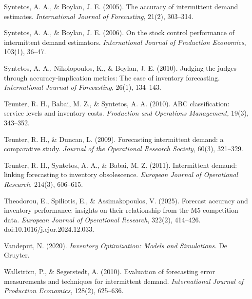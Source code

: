 \documentclass[11pt]{article}
\begin{document}
\begin{list}{}{%
  \setlength{\leftmargin}{1.5em}%
  \setlength{\itemindent}{-1.5em}%
  \setlength{\itemsep}{4pt}%
  \setlength{\parsep}{0pt}}
\item Syntetos, A. A., \& Boylan, J. E. (2005). The accuracy of intermittent
demand estimates. \emph{International Journal of Forecasting}, 21(2), 303--314.

\item Syntetos, A. A., \& Boylan, J. E. (2006). On the stock control
performance of intermittent demand estimators. \emph{International Journal of
Production Economics}, 103(1), 36--47.

\item Syntetos, A. A., Nikolopoulos, K., \& Boylan, J. E. (2010). Judging the
judges through accuracy-implication metrics: The case of inventory
forecasting. \emph{International Journal of Forecasting}, 26(1), 134--143.

\item Teunter, R. H., Babai, M. Z., \& Syntetos, A. A. (2010). ABC
classification: service levels and inventory costs. \emph{Production and
Operations Management}, 19(3), 343--352.

\item Teunter, R. H., \& Duncan, L. (2009). Forecasting intermittent demand:
a comparative study. \emph{Journal of the Operational Research Society},
60(3), 321--329.

\item Teunter, R. H., Syntetos, A. A., \& Babai, M. Z. (2011). Intermittent
demand: linking forecasting to inventory obsolescence. \emph{European Journal
of Operational Research}, 214(3), 606--615.

\item Theodorou, E., Spiliotis, E., \& Assimakopoulos, V. (2025). Forecast
accuracy and inventory performance: insights on their relationship from the M5
competition data. \emph{European Journal of Operational Research}, 322(2),
414--426. doi:10.1016/j.ejor.2024.12.033.

\item Vandeput, N. (2020). \emph{Inventory Optimization: Models and
Simulations.} De Gruyter.

\item Wallstr\"om, P., \& Segerstedt, A. (2010). Evaluation of forecasting
error measurements and techniques for intermittent demand.
\emph{International Journal of Production Economics}, 128(2), 625--636.

\end{list}
\end{document}
